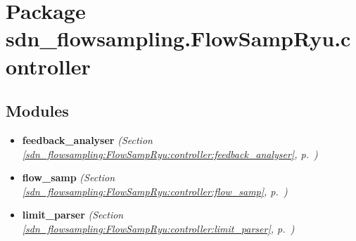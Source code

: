 %
%
%


\section{Package sdn\_flowsampling.FlowSampRyu.controller}

    \label{sdn_flowsampling:FlowSampRyu:controller}


\subsection{Modules}

\begin{itemize}
\setlength{\parskip}{0ex}
\item \textbf{feedback\_analyser}
  \textit{(Section \ref{sdn_flowsampling:FlowSampRyu:controller:feedback_analyser}, p.~\pageref{sdn_flowsampling:FlowSampRyu:controller:feedback_analyser})}

\item \textbf{flow\_samp}
  \textit{(Section \ref{sdn_flowsampling:FlowSampRyu:controller:flow_samp}, p.~\pageref{sdn_flowsampling:FlowSampRyu:controller:flow_samp})}

\item \textbf{limit\_parser}
  \textit{(Section \ref{sdn_flowsampling:FlowSampRyu:controller:limit_parser}, p.~\pageref{sdn_flowsampling:FlowSampRyu:controller:limit_parser})}

\end{itemize}



